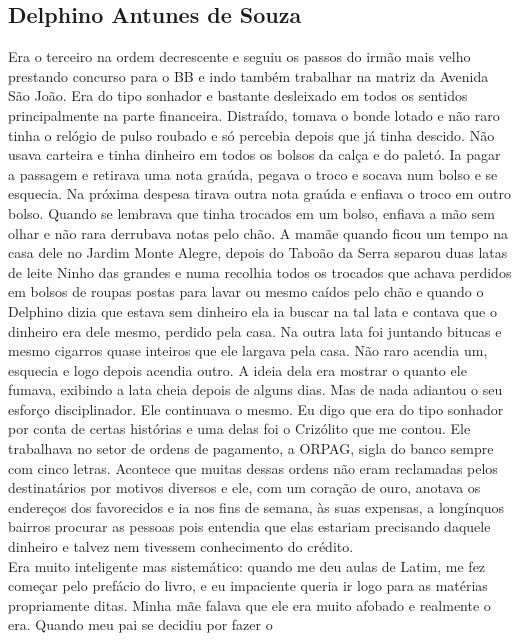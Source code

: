 \documentclass[12pt,brazil,]{book}
\begin{document}
\subsection{Delphino Antunes de Souza}\label{delphino-antunes-de-souza}

Era o terceiro na ordem decrescente e seguiu os passos do irmão mais
velho prestando concurso para o BB e indo também trabalhar na matriz da
Avenida São João. Era do tipo sonhador e bastante desleixado em todos os
sentidos principalmente na parte financeira. Distraído, tomava o bonde
lotado e não raro tinha o relógio de pulso roubado e só percebia depois
que já tinha descido. Não usava carteira e tinha dinheiro em todos os
bolsos da calça e do paletó. Ia pagar a passagem e retirava uma nota
graúda, pegava o troco e socava num bolso e se esquecia. Na próxima
despesa tirava outra nota graúda e enfiava o troco em outro bolso.
Quando se lembrava que tinha trocados em um bolso, enfiava a mão sem
olhar e não rara derrubava notas pelo chão. A mamãe quando ficou um
tempo na casa dele no Jardim Monte Alegre, depois do Taboão da Serra
separou duas latas de leite Ninho das grandes e numa recolhia todos os
trocados que achava perdidos em bolsos de roupas postas para lavar ou
mesmo caídos pelo chão e quando o Delphino dizia que estava sem dinheiro
ela ia buscar na tal lata e contava que o dinheiro era dele mesmo,
perdido pela casa. Na outra lata foi juntando bitucas e mesmo cigarros
quase inteiros que ele largava pela casa. Não raro acendia um, esquecia
e logo depois acendia outro. A ideia dela era mostrar o quanto ele
fumava, exibindo a lata cheia depois de alguns dias. Mas de nada
adiantou o seu esforço disciplinador. Ele continuava o mesmo. Eu digo
que era do tipo sonhador por conta de certas histórias e uma delas foi o
Crizólito que me contou. Ele trabalhava no setor de ordens de pagamento,
a ORPAG, sigla do banco sempre com cinco letras. Acontece que muitas
dessas ordens não eram reclamadas pelos destinatários por motivos
diversos e ele, com um coração de ouro, anotava os endereços dos
favorecidos e ia nos fins de semana, às suas expensas, a longínquos
bairros procurar as pessoas pois entendia que elas estariam precisando
daquele dinheiro e talvez nem tivessem conhecimento do crédito.\\
Era muito inteligente mas sistemático: quando me deu aulas de Latim, me
fez começar pelo prefácio do livro, e eu impaciente queria ir logo para
as matérias propriamente ditas. Minha mãe falava que ele era muito
afobado e realmente o era. Quando meu pai se decidiu por fazer o
\end{document}
